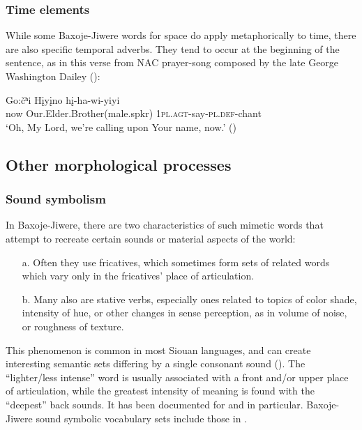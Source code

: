 \documentclass[output=paper]{LSP/langsci}
\begin{document}
\subsubsection{Time elements}  While some Baxoje-Jiwere words for space do apply metaphorically to time, there are also specific temporal adverbs.  They tend to occur at the beginning of the sentence, as in this verse from NAC prayer-song composed by the late George Washington Dailey ():

\ea \gll Go:\v{c}ʰi   H\k{i}y\k{i}no    h\k{i}-ha-wi-yiyi \\
now     Our.Elder.Brother(male.spkr) \textsc{1pl.agt}-say-\textsc{pl.def}-chant	\\
\glt `Oh, My Lord, we're calling upon Your name, now.'	(\citealt{Davidson1997})
\z

\subsection{Other morphological processes}

\subsubsection{Sound symbolism}  

In Baxoje-Jiwere, there are two characteristics of such mimetic words that attempt to recreate certain sounds or material aspects of the world:   

\begin{itemize}
\item[a.] Often they use fricatives,  which sometimes form sets of related words which vary only in the fricatives' place of articulation.   
\item[b.] Many also are stative verbs, especially ones related to topics of color shade, intensity of hue, or other changes in sense perception, as in volume of noise, or roughness of texture. 
\end{itemize}

 This phenomenon is common in most Siouan languages, and can create interesting semantic sets differing by a single consonant sound (\citealt[468-469]{Rankin2005b}). The ``lighter/less intense'' word is usually associated with a front and/or upper place of articulation, while the greatest intensity of meaning is found with the ``deepest'' back sounds.  It has been documented for  and  in particular.  Baxoje-Jiwere sound symbolic vocabulary sets include those in . 
 
\end{document}
